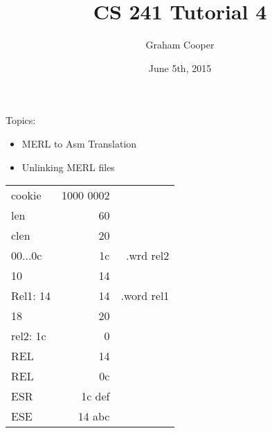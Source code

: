 \documentclass[12pt]{article}
\title{\vspace{-15ex}CS 241 Tutorial 4\vspace{-1ex}}
\date{June 5th, 2015}
\author{Graham Cooper}
\begin{document}
	\maketitle
	
	Topics:
	\begin{itemize}
		\item MERL to Asm Translation
		\item Unlinking MERL files
	\end{itemize}
	
	\begin{tabular}{l r r}
		cookie & 1000 0002 &\\
		len    & 60 &\\
		clen & 20 &\\
		00...0c & 1c & .wrd rel2\\
		10 & 14 &\\
		Rel1: 14 & 14 & .word rel1\\
		18 & 20 &\\
		rel2: 1c & 0 &\\
		REL & 14 &\\
		REL & 0c &\\
		ESR & 1c def &\\
		ESE & 14 abc &\\
	\end{tabular}
	
	
\end{document}
